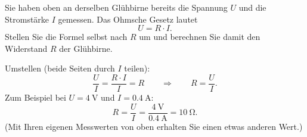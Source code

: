 \documentclass[addpoints,11pt,a4paper]{exam}
\begin{document}
\needspace{8cm}
\begin{questions}
\begin{taskbox}
\question[3] Sie haben oben an derselben Glühbirne bereits die Spannung
$U$ und die Stromstärke $I$ gemessen. Das Ohmsche Gesetz lautet
\[
  U = R\cdot I.
\]
Stellen Sie die Formel selbst nach $R$ um und berechnen Sie damit den
Widerstand $R$ der Glühbirne.
\begin{answerbox}
\vspace{2.5cm}
\end{answerbox}
\begin{solution}
Umstellen (beide Seiten durch $I$ teilen):
\[
  \frac{U}{I} = \frac{R\cdot I}{I} = R \qquad\Longrightarrow\qquad R=\frac{U}{I}.
\]
Zum Beispiel bei $U=\SI{4}{\volt}$ und $I=\SI{0.4}{\ampere}$:
\[
  R = \frac{U}{I} = \frac{\SI{4}{\volt}}{\SI{0.4}{\ampere}} = \SI{10}{\ohm}.
\]
(Mit Ihren eigenen Messwerten von oben erhalten Sie einen etwas anderen
Wert.)
\end{solution}
\end{taskbox}
\end{questions}
\end{document}
